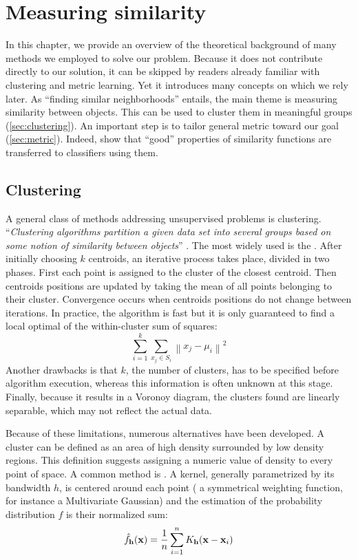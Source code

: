 \chapter{Measuring similarity}
\label{ch:background}

In this chapter, we provide an overview of the theoretical background of many
methods we employed to solve our problem. Because it does not contribute
directly to our solution, it can be skipped by readers already familiar with
clustering and metric learning. Yet it introduces many concepts on which we
rely later. As \enquote{finding similar neighborhoods} entails, the main theme
is measuring similarity between objects. This can be used to cluster them in
meaningful groups (\autoref{sec:clustering}). An important step is to tailor
general metric toward our goal (\autoref{sec:metric}). Indeed,
\textcite{GoodSimilarity08} show that \enquote{good} properties of similarity
functions are transferred to classifiers using them.

\section{Clustering}
\label{sec:clustering}

A general class of methods addressing unsupervised problems is clustering.
\enquote{\emph{Clustering algorithms partition a given data set into several
groups based on some notion of similarity between objects}}
\autocite{LimitsClustering05}. The most widely used is the
 \autocite{kmeans67}. After initially choosing
$k$ centroids, an iterative process takes place, divided in two phases. First
each point is assigned to the cluster of the closest centroid. Then centroids
positions are updated by taking the mean of all points belonging to their
cluster. Convergence occurs when centroids positions do not change between
iterations. In practice, the algorithm is fast but it is only guaranteed to
find a local optimal of the within-cluster sum of squares: \[ \sum_{i=1}^{k}
\sum_{ x_j \in S_i} \left\| x_j - \mu_i \right\|^2 \] Another drawbacks is that
$k$, the number of clusters, has to be specified before algorithm execution,
whereas this information is often unknown at this stage. Finally, because it
results in a Voronoy diagram, the clusters found are linearly separable, which
may not reflect the actual data.

Because of these limitations, numerous alternatives have been developed. A
cluster can be defined as an area of high density surrounded by low density
regions. This definition suggests assigning a numeric value of density to every
point of space. A common method is  \autocite{KDE56}. A kernel, generally parametrized by its
bandwidth $h$, is centered around each point
(\ie{} a symmetrical weighting function, for instance a Multivariate Gaussian)
and the estimation of the probability distribution $f$ is their normalized sum:
\[ \hat{f}_\bold{h}(\bold{x})= \frac{1}{n} \sum_{i=1}^n K_\bold{h} (\bold{x} -
\bold{x}_i) \]

